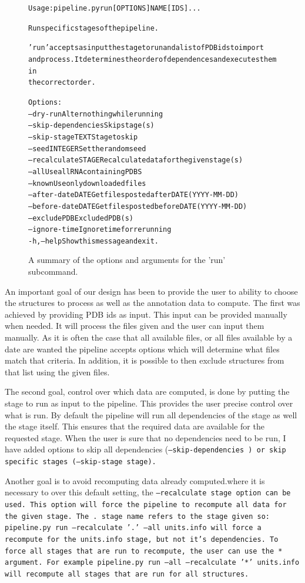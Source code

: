 \begin{figure}
\begin{alltt}
Usage: pipeline.py run [OPTIONS] NAME [IDS]...

  Run specific stages of the pipeline.

  'run' accepts as input the stage to run and a list of PDB ids to import
  and process. It determines the order of dependences and executes them in
  the correct order.

Options:
  --dry-run            Alter nothing while running
  --skip-dependencies  Skip stage(s)
  --skip-stage TEXT    Stage to skip
  --seed INTEGER       Set the random seed
  --recalculate STAGE  Recalculate data for the given stage(s)
  --all                Use all RNA containing PDBS
  --known              Use only downloaded files
  --after-date DATE    Get files posted after DATE (YYYY-MM-DD)
  --before-date DATE   Get files posted before DATE (YYYY-MM-DD)
  --exclude PDB        Excluded PDB(s)
  --ignore-time        Ignore time for rerunning
  -h, --help           Show this message and exit.
\end{alltt}
\caption{A summary of the options and arguments for the 'run' subcommand.}
\label{fig:running-options}
\end{figure}

An important goal of our design has been to provide the user to ability to
choose the structures to process as well as the annotation data to compute. The
first was achieved by providing PDB ids as input. This input can be provided
manually when needed. It will process the files given and the user can input
them manually. As it is often the case that all available files, or all files
available by a date are wanted the pipeline accepts options which will determine
what files match that criteria. In addition, it is possible to then exclude
structures from that list using the given files.

The second goal, control over which data are computed, is done by putting the
stage to run as input to the pipeline. This provides the user precise control
over what is run. By default the pipeline will run all dependencies of the stage
as well the stage itself. This ensures that the required data are available for
the requested stage. When the user is sure that no dependencies need to be run,
I have added options to skip all dependencies (\tt{--skip-dependencies} ) or skip
specific stages (\tt{--skip-stage stage}).

Another goal is to avoid recomputing data already computed.where it is necessary
to over this default setting, the \tt{--recalculate stage} option can be used.
This option will force the pipeline to recompute all data for the given stage.
The \tt{.} stage name refers to the stage given so: \tt{pipeline.py run
--recalculate '.' --all units.info} will force a recompute for the units.info
stage, but not it's dependencies. To force all stages that are run to recompute,
the user can use the \tt{*} argument. For example \tt{pipeline.py run --all
--recalculate '*' units.info} will recompute all stages that are run for all
structures.

